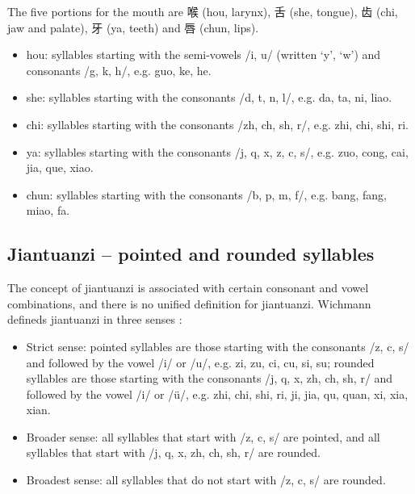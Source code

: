 The five portions for the mouth are 喉 (hou, larynx), 舌 (she, tongue), 齿 (chi, jaw and palate), 牙 (ya, teeth) and 唇 (chun, lips).
\begin{itemize}
\item hou: syllables starting with the semi-vowels /i, u/ (written `y', `w') and consonants /g, k, h/, e.g. guo, ke, he.
\item she: syllables starting with the consonants /d, t, n, l/, e.g. da, ta, ni, liao.
\item chi: syllables starting with the consonants /zh, ch, sh, r/, e.g. zhi, chi, shi, ri.
\item ya: syllables starting with the consonants /j, q, x, z, c, s/, e.g. zuo, cong, cai, jia, que, xiao.
\item chun: syllables starting with the consonants /b, p, m, f/, e.g. bang, fang, miao, fa.
\end{itemize}

\subsection{Jiantuanzi -- pointed and rounded syllables}\label{sec:ch2:jiantuanzi}

The concept of jiantuanzi is associated with certain consonant and vowel combinations, and there is no unified definition for jiantuanzi. Wichmann defineds jiantuanzi in three senses \cite{Wichmann1991a}:
\begin{itemize}
\item Strict sense: pointed syllables are those starting with the consonants /z, c, s/ and followed by the vowel /i/ or /u/, e.g. zi, zu, ci, cu, si, su; rounded syllables are those starting with the consonants /j, q, x, zh, ch, sh, r/ and followed by the vowel /i/ or /ü/, e.g. zhi, chi, shi, ri, ji, jia, qu, quan, xi, xia, xian.
\item Broader sense: all syllables that start with /z, c, s/ are pointed, and all syllables that start with /j, q, x, zh, ch, sh, r/ are rounded.
\item Broadest sense: all syllables that do not start with /z, c, s/ are rounded.
\end{itemize}

